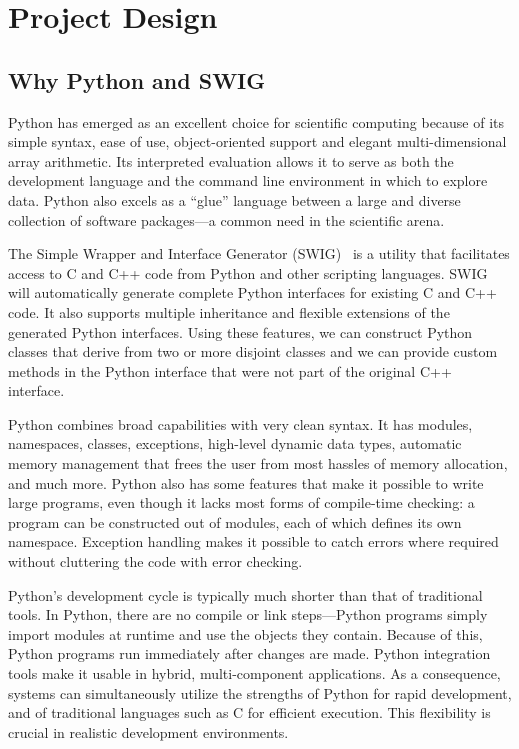 \documentclass[acmtocl]{acmtrans2m}
\begin{document}
\section{Project Design}
\label{sec:design}

\subsection{Why Python and SWIG}
\label{sec:why}

Python has emerged as an excellent choice for scientific computing
because of its simple syntax, ease of use, object-oriented support and
elegant multi-dimensional array arithmetic.  Its interpreted
evaluation allows it to serve as both the development language and the
command line environment in which to explore data.  Python also excels
as a ``glue'' language between a large and diverse collection of
software packages---a common need in the scientific arena.

The Simple Wrapper and Interface Generator (SWIG)~\cite{swig} is a
utility that facilitates access to C and C++ code from Python and
other scripting languages. SWIG will automatically generate complete
Python interfaces for existing C and C++ code.  It also supports
multiple inheritance and flexible extensions of the generated Python
interfaces.  Using these features, we can construct Python classes
that derive from two or more disjoint classes and we can provide
custom methods in the Python interface that were not part of the
original C++ interface.

Python combines broad capabilities with very clean syntax.  It has
modules, namespaces, classes, exceptions, high-level dynamic data
types, automatic memory management that frees the user from most
hassles of memory allocation, and much more.  Python also has some
features that make it possible to write large programs, even though
it lacks most forms of compile-time checking: a program can be
constructed out of modules, each of which defines its own namespace.
Exception handling makes it possible to catch errors where required
without cluttering the code with error checking.

Python's development cycle is typically much shorter than that of
traditional tools.  In Python, there are no compile or link
steps---Python programs simply import modules at runtime and use the
objects they contain.  Because of this, Python programs run
immediately after changes are made.  Python integration tools make
it usable in hybrid, multi-component applications.  As a
consequence, systems can simultaneously utilize the strengths of
Python for rapid development, and of traditional languages such as C
for efficient execution.  This flexibility is crucial in realistic
development environments.
\end{document}
